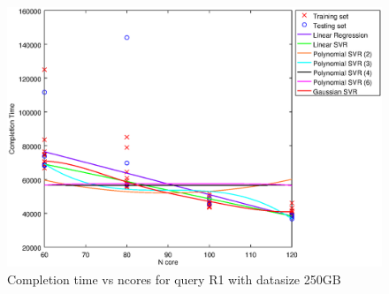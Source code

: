 
\begin {figure}[hbtp]
\centering
\includegraphics[width=\textwidth]{output/R1_250_ONLY_1_LINEAR_NCORE/plot_R1_250.eps}
\caption{Completion time vs ncores for query R1 with datasize 250GB}
\label{fig:only_1_linear_R1_250}
\end {figure}
